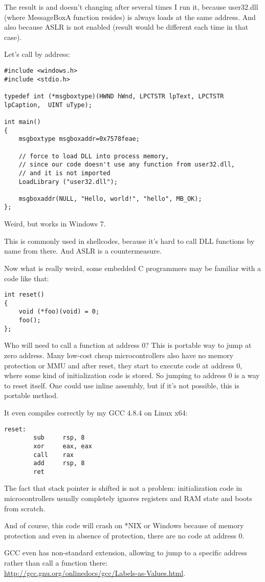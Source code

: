 The result is  and doesn't changing after several times I run it,
because user32.dll (where MessageBoxA function resides) is always loads at the same address.
And also because \ac{ASLR} is not enabled (result would be different each time in that case).

Let's call  by address:

\begin{lstlisting}
#include <windows.h>
#include <stdio.h>

typedef int (*msgboxtype)(HWND hWnd, LPCTSTR lpText, LPCTSTR lpCaption,  UINT uType);

int main()
{
	msgboxtype msgboxaddr=0x7578feae;

	// force to load DLL into process memory, 
	// since our code doesn't use any function from user32.dll, 
	// and it is not imported
	LoadLibrary ("user32.dll");

	msgboxaddr(NULL, "Hello, world!", "hello", MB_OK);
};
\end{lstlisting}

Weird, but works in Windows 7.

This is commonly used in shellcodes, because it's hard to call DLL functions by name from there.
And \ac{ASLR} is a countermeasure.

Now what is really weird, some embedded C programmers may be familiar with a code like that:

\begin{lstlisting}
int reset()
{
	void (*foo)(void) = 0;
	foo();
};
\end{lstlisting}

Who will need to call a function at address 0?
This is portable way to jump at zero address.
Many low-cost cheap microcontrollers also have no memory protection or \ac{MMU} and after reset, they start to execute code at address 0, where some kind of initialization code is stored.
So jumping to address 0 is a way to reset itself.
One could use inline assembly, but if it's not possible, this is portable method.

It even compiles correctly by my GCC 4.8.4 on Linux x64:

\begin{lstlisting}
reset:
        sub     rsp, 8
        xor     eax, eax
        call    rax
        add     rsp, 8
        ret
\end{lstlisting}

The fact that stack pointer is shifted is not a problem: initialization code in microcontrollers usually completely ignores registers and \ac{RAM} state and boots from scratch.

And of course, this code will crash on *NIX or Windows because of memory protection and even in absence of protection, there are no code at address 0.

GCC even has non-standard extension, allowing to jump to a specific address rather than call a function there:\\
\url{http://gcc.gnu.org/onlinedocs/gcc/Labels-as-Values.html}.

